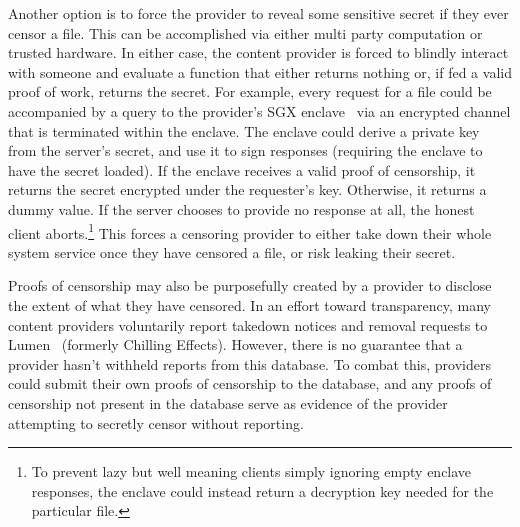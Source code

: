 Another option is to force the provider to reveal some sensitive secret if they
ever censor a file. This can be accomplished via either multi party
computation or trusted hardware. In either case, the content provider is forced
to blindly interact with someone and evaluate a function that either returns
nothing or, if fed a valid proof of work, returns the secret.  For example,
every request for a file could be accompanied by a query to the provider's SGX
enclave~\cite{sgx} via an encrypted channel that is terminated within the enclave. The
enclave could derive a private key from the server's secret, and use it to sign
responses (requiring the enclave to have the secret loaded). If the
enclave receives a valid proof of censorship, it returns the secret encrypted under
the requester's key. Otherwise, it
returns a dummy value.  If the server chooses to provide no response at all,
the honest client
aborts.\footnote{To prevent lazy but well meaning clients simply ignoring empty
enclave responses,
the enclave could instead return a decryption key needed for the particular file.}
This forces a censoring provider to either take down their whole system service
once they have censored a file, or risk leaking their secret.


Proofs of censorship may also be purposefully created by a provider to disclose
the extent of what they have censored. In an effort toward transparency, many
content providers voluntarily report takedown notices and removal requests to
Lumen~\cite{lumen} (formerly Chilling Effects). However, there is no guarantee
that a provider hasn't withheld reports from this database. To combat this,
providers could submit their own proofs of censorship to the database, and any
proofs of censorship not present in the database serve as evidence of the
provider attempting to secretly censor without reporting.

%
%
